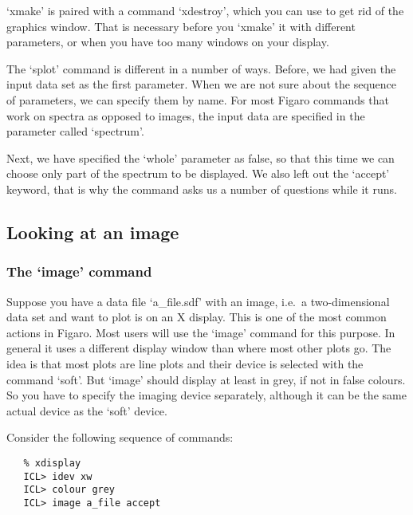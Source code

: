    `xmake' is paired with a command `xdestroy', which you can use to
   get rid of the graphics window. That is necessary before you
   `xmake' it with different parameters, or when you have too many
   windows on your display.

   The `splot' command is different in a number of ways. Before, we had
   given the input data set as the first parameter. When we are not sure
   about the sequence of parameters, we can specify them by name. For
   most Figaro commands that work on spectra as opposed to images, the
   input data are specified in the parameter called `spectrum'.

   Next, we have specified the `whole' parameter as false, so that
   this time we can choose only part of the spectrum to be displayed. We
   also left out the `accept' keyword, that is why the command asks us
   a number of questions while it runs.


\subsection{\label{lookimag}Looking at an image}


\subsubsection{\label{lookimagimage}The `image' command}

   Suppose you have a data file `a\_file.sdf' with an image, i.e.\ a
   two-dimensional data set and want to plot is on an X display. This is
   one of the most common actions in Figaro. Most users will use the
   `image' command for this purpose. In general it uses a different
   display window than where most other plots go. The idea is that most
   plots are line plots and their device is selected with the command
   `soft'. But `image' should display at least in grey, if not in
   false colours. So you have to specify the imaging device separately,
   although it can be the same actual device as the `soft' device.

   Consider the following sequence of commands:

\begin{verbatim}
   % xdisplay
   ICL> idev xw
   ICL> colour grey
   ICL> image a_file accept
\end{verbatim}

